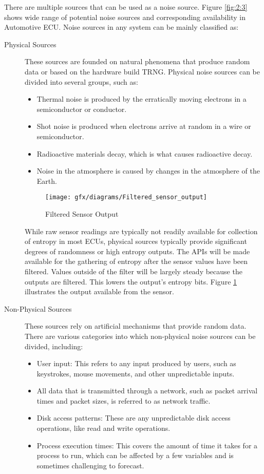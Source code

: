 There are multiple sources that can be used as a noise source. Figure \ref{fig:2:3} shows wide range of potential noise sources and corresponding availability in Automotive ECU. Noise sources in any system can be mainly classified as:
\begin{description}
	\item[Physical Sources] These sources are founded on natural phenomena that produce random data or based on the hardware build TRNG. Physical noise sources can be divided into several groups, such as:
	\begin{itemize}
		\item Thermal noise is produced by the erratically moving electrons in a semiconductor or conductor.
		\item Shot noise is produced when electrons arrive at random in a wire or semiconductor.
		\item Radioactive materials decay, which is what causes radioactive decay.
		\item Noise in the atmosphere is caused by changes in the atmosphere of the Earth.		
	\end{itemize}
	\begin{figure}[htbp]
		\centering
		\texttt{[image: gfx/diagrams/Filtered\_sensor\_output]}
		\caption{Filtered Sensor Output}
		\label{fig:2:4}
	\end{figure}

	While raw sensor readings are typically not readily available for collection of entropy in most ECUs, physical sources typically provide significant degrees of randomness or high entropy outputs. The APIs will be made available for the gathering of entropy after the sensor values have been filtered. Values outside of the filter will be largely steady because the outputs are filtered. This lowers the output's entropy bits. Figure \ref{fig:2:4} illustrates the output available from the sensor.
	\item[Non-Physical Sources] These sources rely on artificial mechanisms that provide random data. There are various categories into which non-physical noise sources can be divided, including:
	\begin{itemize}
		\item User input: This refers to any input produced by users, such as keystrokes, mouse movements, and other unpredictable inputs.
		\item All data that is transmitted through a network, such as packet arrival times and packet sizes, is referred to as network traffic.
		\item Disk access patterns: These are any unpredictable disk access operations, like read and write operations.
		\item Process execution times: This covers the amount of time it takes for a process to run, which can be affected by a few variables and is sometimes challenging to forecast.		
	\end{itemize}
\end{description}

